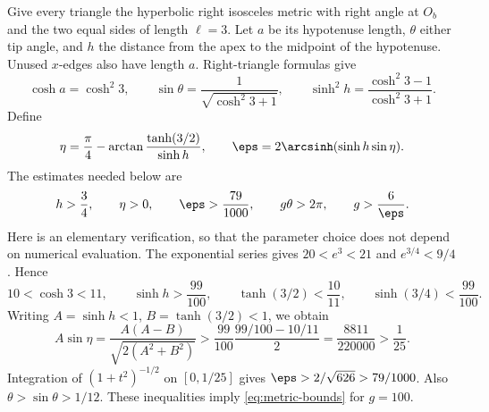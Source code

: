 Give every triangle the hyperbolic right isosceles metric with right
angle at \(O_b\) and the two equal sides of length \(\ell=3\).
Let \(a\) be its hypotenuse length, \(\theta\) either tip angle, and
\(h\) the distance from the apex to the midpoint of the hypotenuse.
Unused \(x\)-edges also have length \(a\). Right-triangle formulas give
\begin{equation}\label{eq:triangle-metric}
 \cosh a=\cosh^2 3,\qquad
 \sin\theta=\frac1{\sqrt{\cosh^2 3+1}},\qquad
 \sinh^2h=\frac{\cosh^2 3-1}{\cosh^2 3+1}.
\end{equation}
Define
\begin{equation}\label{eq:eta-epsilon}
 \eta=\frac\pi4-\arctan\frac{\tanh(3/2)}{\sinh h},
 \qquad
 \eps=2\arcsinh(\sinh h\sin\eta).
\end{equation}
The estimates needed below are
\begin{equation}\label{eq:metric-bounds}
 h>\frac34,\qquad \eta>0,\qquad
 \eps>\frac{79}{1000},\qquad
 g\theta>2\pi,\qquad g>\frac6\eps.
\end{equation}
Here is an elementary verification, so that the parameter choice does
not depend on numerical evaluation. The exponential series gives
\(20<e^3<21\) and \(e^{3/4}<9/4\). Hence
\[
 10<\cosh3<11,\qquad
 \sinh h>\frac{99}{100},\qquad
 \tanh(3/2)<\frac{10}{11},\qquad
 \sinh(3/4)<\frac{99}{100}.
\]
Writing \(A=\sinh h<1\), \(B=\tanh(3/2)<1\), we obtain
\[
 A\sin\eta
 =\frac{A(A-B)}{\sqrt{2(A^2+B^2)}}
 >\frac{99}{100}\frac{99/100-10/11}{2}
 =\frac{8811}{220000}>\frac1{25}.
\]
Integration of \((1+t^2)^{-1/2}\) on \([0,1/25]\) gives
\(\eps>2/\sqrt{626}>79/1000\).
Also \(\theta>\sin\theta>1/12\). These inequalities imply
\eqref{eq:metric-bounds} for \(g=100\).

